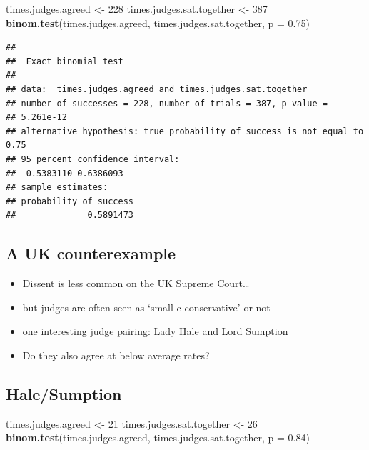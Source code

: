 \documentclass[12pt,twoside]{article}
\newenvironment{Shaded}{}{}
\newcommand{\KeywordTok}[1]{\textcolor[rgb]{0.00,0.44,0.13}{\textbf{{#1}}}}
\newcommand{\DataTypeTok}[1]{\textcolor[rgb]{0.56,0.13,0.00}{{#1}}}
\newcommand{\DecValTok}[1]{\textcolor[rgb]{0.25,0.63,0.44}{{#1}}}
\newcommand{\FloatTok}[1]{\textcolor[rgb]{0.25,0.63,0.44}{{#1}}}
\newcommand{\StringTok}[1]{\textcolor[rgb]{0.25,0.44,0.63}{{#1}}}
\newcommand{\NormalTok}[1]{{#1}}
\providecommand{\tightlist}{%
  \setlength{\itemsep}{0pt}\setlength{\parskip}{0pt}}
\begin{document}
\small

\begin{Shaded}
\begin{Highlighting}[]
\NormalTok{times.judges.agreed <-}\StringTok{ }\DecValTok{228}
\NormalTok{times.judges.sat.together <-}\StringTok{ }\DecValTok{387}
\KeywordTok{binom.test}\NormalTok{(times.judges.agreed,}
           \NormalTok{times.judges.sat.together,}
           \DataTypeTok{p =} \FloatTok{0.75}\NormalTok{)}
\end{Highlighting}
\end{Shaded}

\begin{verbatim}
## 
##  Exact binomial test
## 
## data:  times.judges.agreed and times.judges.sat.together
## number of successes = 228, number of trials = 387, p-value =
## 5.261e-12
## alternative hypothesis: true probability of success is not equal to 0.75
## 95 percent confidence interval:
##  0.5383110 0.6386093
## sample estimates:
## probability of success 
##              0.5891473
\end{verbatim}

\subsection{A UK counterexample}\label{a-uk-counterexample}

\begin{itemize}
\tightlist
\item
  Dissent is less common on the UK Supreme Court\ldots{}
\item
  but judges are often seen as `small-c conservative' or not
\item
  one interesting judge pairing: Lady Hale and Lord Sumption
\item
  Do they also agree at below average rates?
\end{itemize}

\subsection{Hale/Sumption}\label{halesumption}

\begin{Shaded}
\begin{Highlighting}[]
\NormalTok{times.judges.agreed <-}\StringTok{ }\DecValTok{21}
\NormalTok{times.judges.sat.together <-}\StringTok{ }\DecValTok{26}
\KeywordTok{binom.test}\NormalTok{(times.judges.agreed,}
           \NormalTok{times.judges.sat.together,}
           \DataTypeTok{p =} \FloatTok{0.84}\NormalTok{)}
\end{Highlighting}
\end{Shaded}
\end{document}
